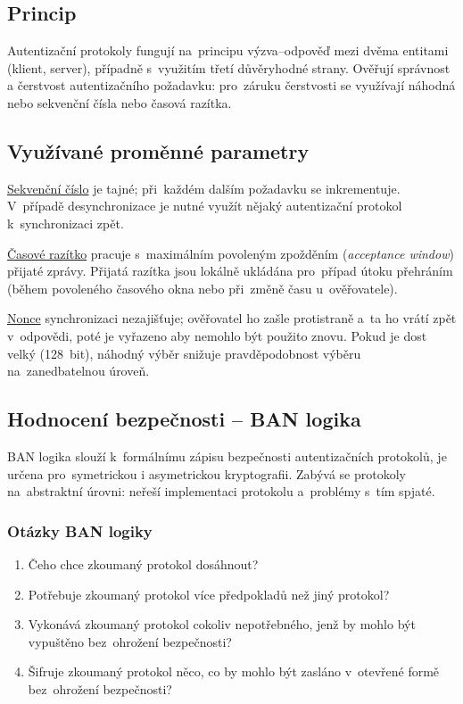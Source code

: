 \begin{itemize}
\subsection{Princip}

Autentizační protokoly fungují na~principu výzva--odpověď mezi dvěma entitami (klient, server), případně s~využitím třetí důvěryhodné strany.
Ověřují správnost a čerstvost autentizačního požadavku: pro~záruku čerstvosti se využívají náhodná nebo sekvenční čísla nebo časová razítka.


\subsection{Využívané proměnné parametry}

\uline{Sekvenční číslo} je tajné; při~každém dalším požadavku se inkrementuje.
V~případě desynchronizace je nutné využít nějaký autentizační protokol k~synchronizaci zpět.

\uline{Časové razítko} pracuje s~maximálním povoleným zpožděním (\emph{acceptance window}) přijaté zprávy.
Přijatá razítka jsou lokálně ukládána pro~případ útoku přehráním (během povoleného časového okna nebo při~změně času u~ověřovatele).

\uline{Nonce} synchronizaci nezajišťuje; ověřovatel ho zašle protistraně a~ta ho vrátí zpět v~odpovědi, poté je vyřazeno aby nemohlo být použito znovu.
Pokud je dost velký (128~bit), náhodný výběr snižuje pravděpodobnost výběru na~zanedbatelnou úroveň.


\subsection{Hodnocení bezpečnosti -- BAN logika}

BAN logika slouží k~formálnímu zápisu bezpečnosti autentizačních protokolů, je určena pro~symetrickou i asymetrickou kryptografii.
Zabývá se protokoly na~abstraktní úrovni: neřeší implementaci protokolu a~problémy s~tím spjaté.

\subsubsection{Otázky BAN logiky}

\begin{enumerate}
    \item Čeho chce zkoumaný protokol dosáhnout?
    \item Potřebuje zkoumaný protokol více předpokladů než jiný protokol?
    \item Vykonává zkoumaný protokol cokoliv nepotřebného, jenž by mohlo být vypuštěno bez~ohrožení bezpečnosti?
    \item Šifruje zkoumaný protokol něco, co by mohlo být zasláno v~otevřené formě bez~ohrožení bezpečnosti?
\end{enumerate}


\end{itemize}
